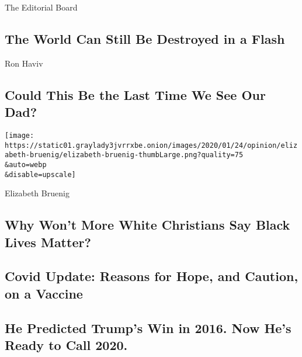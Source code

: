 The Editorial Board

\hypertarget{the-world-can-still-be-destroyed-in-a-flash}{%
\subsection{The World Can Still Be Destroyed in a
Flash}\label{the-world-can-still-be-destroyed-in-a-flash}}

\href{/2020/08/06/opinion/coronavirus-baruch-haviv-death.html}{}

Ron Haviv

\hypertarget{could-this-be-the-last-time-we-see-our-dad}{%
\subsection{Could This Be the Last Time We See Our
Dad?}\label{could-this-be-the-last-time-we-see-our-dad}}

\href{/2020/08/06/opinion/sunday/gloria-purvis-george-floyd-blm.html}{}

\texttt{[image: https://static01.graylady3jvrrxbe.onion/images/2020/01/24/opinion/elizabeth-bruenig/elizabeth-bruenig-thumbLarge.png?quality=75\\\&auto=webp\\\&disable=upscale]}

Elizabeth Bruenig

\hypertarget{why-wont-more-white-christians-say-black-lives-matter}{%
\subsection{Why Won't More White Christians Say Black Lives
Matter?}\label{why-wont-more-white-christians-say-black-lives-matter}}

\href{/video/opinion/100000007278127/coronavirus-vaccine-update.html}{}

\hypertarget{covid-update-reasons-for-hope-and-caution-on-a-vaccine}{%
\subsection{Covid Update: Reasons for Hope, and Caution, on a
Vaccine}\label{covid-update-reasons-for-hope-and-caution-on-a-vaccine}}

\href{/video/opinion/100000007227782/2020-election-prediction-allan-lichtman.html}{}

\hypertarget{he-predicted-trumps-win-in-2016-now-hes-ready-to-call-2020}{%
\subsection{He Predicted Trump's Win in 2016. Now He's Ready to Call
2020.}\label{he-predicted-trumps-win-in-2016-now-hes-ready-to-call-2020}}

